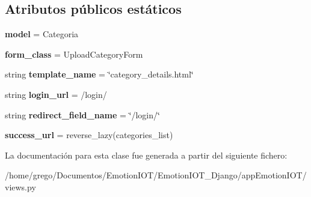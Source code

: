 \subsection*{Atributos públicos estáticos}
\begin{DoxyCompactItemize}
\item 
{\bfseries model} = Categoria\hypertarget{classappEmotionIOT_1_1views_1_1Create__category_a87ffe92dbf2de6723abef4f514c1835f}{}\label{classappEmotionIOT_1_1views_1_1Create__category_a87ffe92dbf2de6723abef4f514c1835f}

\item 
{\bfseries form\+\_\+class} = Upload\+Category\+Form\hypertarget{classappEmotionIOT_1_1views_1_1Create__category_ab6d0a01598efb94f036b21f2b6269611}{}\label{classappEmotionIOT_1_1views_1_1Create__category_ab6d0a01598efb94f036b21f2b6269611}

\item 
string {\bfseries template\+\_\+name} = \char`\"{}category\+\_\+details.\+html\char`\"{}\hypertarget{classappEmotionIOT_1_1views_1_1Create__category_aa9294bcb4c749d8970a2643f272ab954}{}\label{classappEmotionIOT_1_1views_1_1Create__category_aa9294bcb4c749d8970a2643f272ab954}

\item 
string {\bfseries login\+\_\+url} = \textquotesingle{}/login/\textquotesingle{}\hypertarget{classappEmotionIOT_1_1views_1_1Create__category_add5176d4640a1d159234518deb7f4d55}{}\label{classappEmotionIOT_1_1views_1_1Create__category_add5176d4640a1d159234518deb7f4d55}

\item 
string {\bfseries redirect\+\_\+field\+\_\+name} = \char`\"{}/login/\char`\"{}\hypertarget{classappEmotionIOT_1_1views_1_1Create__category_a20d14036ebf4620a95dc4386462f1f62}{}\label{classappEmotionIOT_1_1views_1_1Create__category_a20d14036ebf4620a95dc4386462f1f62}

\item 
{\bfseries success\+\_\+url} = reverse\+\_\+lazy(\textquotesingle{}categories\+\_\+list\textquotesingle{})\hypertarget{classappEmotionIOT_1_1views_1_1Create__category_a2d9f66e17fb5e211e1262e934fd3ea3f}{}\label{classappEmotionIOT_1_1views_1_1Create__category_a2d9f66e17fb5e211e1262e934fd3ea3f}

\end{DoxyCompactItemize}


La documentación para esta clase fue generada a partir del siguiente fichero\+:\begin{DoxyCompactItemize}
\item 
/home/grego/\+Documentos/\+Emotion\+I\+O\+T/\+Emotion\+I\+O\+T\+\_\+\+Django/app\+Emotion\+I\+O\+T/views.\+py\end{DoxyCompactItemize}
